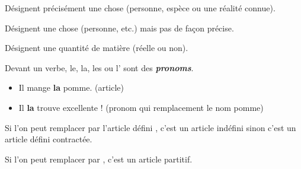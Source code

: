 \documentclass[10pt, french]{article}
\begin{document}
\begin{multicols*}{2}
\begin{definitionNOHFILLsub}
Désignent précisément une chose (personne, espèce ou une réalité connue).
\end{definitionNOHFILLsub}

\begin{definitionNOHFILLsub}
Désignent une chose (personne, etc.) mais pas de façon précise.
\end{definitionNOHFILLsub}

\begin{definitionNOHFILLsub}
Désignent une quantité de matière (réelle ou non).
\end{definitionNOHFILLsub}

\begin{astuces}
Devant un verbe, le, la, les ou l' sont des \textbf{\textit{pronoms}}.
\begin{itemize}
	\item	Il mange \textbf{la} pomme. (article)
	\item	Il \textbf{la} trouve excellente ! (pronom qui remplacement le nom pomme)
\end{itemize}
\end{astuces}

\begin{astuces}
Si l'on peut remplacer  par l'article défini , c'est un article indéfini sinon c'est un article défini contractée.
\end{astuces}

\begin{astuces}
Si l'on peut remplacer  par , c'est un article partitif.
\end{astuces}



\end{multicols*}
\end{document}
